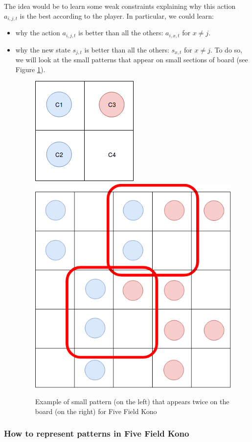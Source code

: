 \documentclass[12pt,twoside]{report}
\begin{document}
The idea would be to learn some weak constraints explaining why this action $a_{i,j,t}$ is the best according to the player. In particular, we could learn:
\begin{itemize}
\item why the action $a_{i,j,t}$ is better than all the others: $a_{i,x,t}$ for $x\neq j$. %
\item why the new state $s_{j,t}$ is better than all the others: $s_{x,t}$ for $x\neq j$. To do so, we will look at the small patterns that appear on small sections of board (see Figure \ref{fig:FFK_pattern}). 
\begin{figure}[h]
\centering
\includegraphics[width=0.4\hsize]{figures/FFK_pattern.png}
\hspace{0.1\hsize}
\includegraphics[width = 0.4\hsize]{figures/FFK_include_pattern.png}
\caption{Example of small pattern (on the left) that appears twice on the board (on the right) for Five Field Kono}
\label{fig:FFK_pattern}
\end{figure}

\end{itemize}



\subsubsection{How to represent patterns in Five Field Kono}
\end{document}
